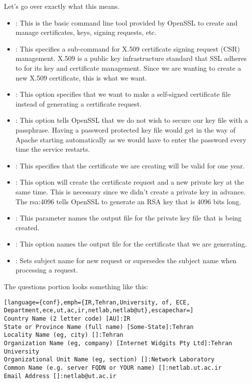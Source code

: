 \documentclass{../UTNetLab}
\begin{document}
Let's go over exactly what this means.

\begin{itemize}
    \item {}: This is the basic command line tool provided by OpenSSL to create and manage certificates, keys, signing requests, etc.
    \item {}: This specifies a sub-command for X.509 certificate signing request (CSR) management.
          X.509 is a public key infrastructure standard that SSL adheres to for its key and certificate management.
          Since we are wanting to create a new X.509 certificate, this is what we want.
    \item {}: This option specifies that we want to make a self-signed certificate file instead of generating a certificate request.
    \item {}: This option tells OpenSSL that we do not wish to secure our key file with a passphrase.
          Having a password protected key file would get in the way of Apache starting automatically as we would have to enter the password every time the service restarts.
    \item {}: This specifies that the certificate we are creating will be valid for one year.
    \item {}: This option will create the certificate request and a new private key at the same time.
          This is necessary since we didn't create a private key in advance.
          The rsa:4096 tells OpenSSL to generate an RSA key that is 4096 bits long.
    \item {}: This parameter names the output file for the private key file that is being created.
    \item {}: This option names the output file for the certificate that we are generating.
    \item {}: Sets subject name for new request or supersedes the subject name when processing a request.
\end{itemize}

The questions portion looks something like this:
{\small
\begin{lstlisting}[language={conf},emph={IR,Tehran,University, of, ECE, Department,ece,ut,ac,ir,netlab,netlab@ut},escapechar=]
Country Name (2 letter code) [AU]:IR 
State or Province Name (full name) [Some-State]:Tehran 
Locality Name (eg, city) []:Tehran 
Organization Name (eg, company) [Internet Widgits Pty Ltd]:Tehran University 
Organizational Unit Name (eg, section) []:Network Laboratory 
Common Name (e.g. server FQDN or YOUR name) []:netlab.ut.ac.ir
Email Address []:netlab@ut.ac.ir
    \end{lstlisting}}
\end{document}
